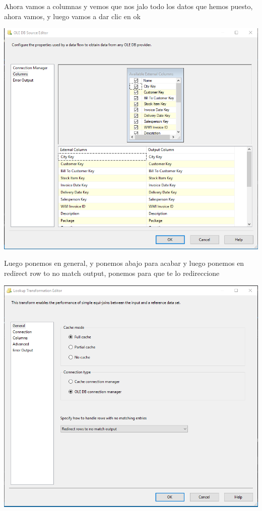 \documentclass[12pt,letterpaper]{article}
\begin{document}
Ahora vamos a columnas y vemos que nos jalo todo los datos que hemos puesto, ahora vamos, y luego vamos a dar clic en ok\\
\begin{center}
\includegraphics[width=17cm]{IMG/36.png} 
\end{center}

Luego ponemos en general, y ponemos abajo para acabar y luego ponemos en redirect row to no match output, ponemos para que te lo redireccione\\
\begin{center}
\includegraphics[width=17cm]{IMG/37.png} 
\end{center}
\end{document}
